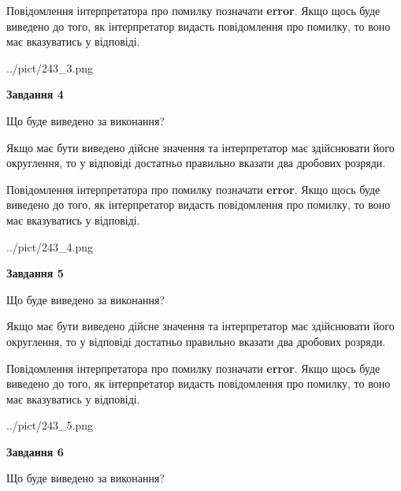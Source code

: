 \documentclass[12pt, ukrainian]{article}
\begin{document}
{\begin {Large}
Повідомлення інтерпретатора про помилку позначати \textbf{error}.
Якщо щось буде виведено до того, як інтерпретатор видасть повідомлення про помилку, 
то воно має вказуватись у відповіді. \par

\begin{center}
	{../pict/243_3.png}
\end{center}
\newpage

{\begin {center}\textbf{Завдання 4}\end {center}}\par
Що буде виведено за виконання? \par

Якщо має бути виведено дійсне значення та інтерпретатор має здійснювати його округлення, 
то у відповіді достатньо правильно вказати два дробових розряди.

Повідомлення інтерпретатора про помилку позначати \textbf{error}.
Якщо щось буде виведено до того, як інтерпретатор видасть повідомлення про помилку, 
то воно має вказуватись у відповіді. \par

\begin{center}
	{../pict/243_4.png}
\end{center}
\newpage

{\begin {center}\textbf{Завдання 5}\end {center}}\par
Що буде виведено за виконання? \par

Якщо має бути виведено дійсне значення та інтерпретатор має здійснювати його округлення, 
то у відповіді достатньо правильно вказати два дробових розряди.

Повідомлення інтерпретатора про помилку позначати \textbf{error}.
Якщо щось буде виведено до того, як інтерпретатор видасть повідомлення про помилку, 
то воно має вказуватись у відповіді. \par

\begin{center}
	{../pict/243_5.png}
\end{center}
\newpage

{\begin {center}\textbf{Завдання 6}\end {center}}\par
Що буде виведено за виконання? \par


\end{Large}}
\end{document}
